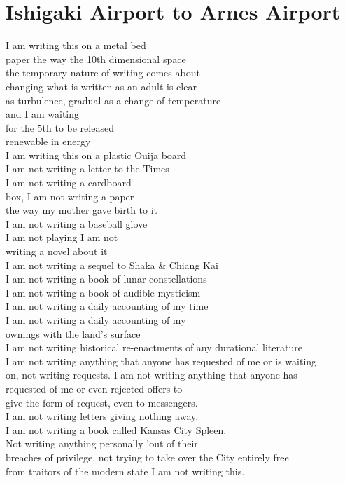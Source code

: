 \documentclass[smalldemyvopaper,11pt,twoside,onecolumn,openright,extrafontsizes]{memoir}
\begin{document}
\chapter{Ishigaki Airport to Arnes Airport}
I am writing this on a metal bed
\\paper the way the 10th dimensional space
\\the temporary nature of writing comes about
\\changing what is written as an adult is clear
\\as turbulence, gradual as a change of temperature
\\and I am waiting
\\for the 5th to be released
\\renewable in energy
\\I am writing this on a plastic Ouija board
\\I am not writing a letter to the Times
\\I am not writing  a cardboard
\\box,  I am not writing  a paper
\\the way my mother gave birth to it
\\I am not writing  a baseball glove
\\I am not playing I am not
\\writing a novel  about it
\\I am not writing a sequel to Shaka \& Chiang Kai
\\I am not writing  a  book of lunar constellations
\\I am not writing  a  book of audible mysticism
\\I am not writing a  daily  accounting  of my time
\\I am not writing  a  daily  accounting  of my
\\ownings with the land's surface
\\I am not writing historical re-enactments of any durational literature
\\I am not writing anything that anyone  has requested of me or is  waiting
\\on,  not  writing  requests.  I am not writing anything that anyone  has
\\requested of me or  even  rejected  offers  to
\\give the form of request,  even to messengers.
\\I am not writing  letters  giving nothing away.
\\I am not writing  a  book  called Kansas City Spleen.
\\Not  writing  anything  personally  'out of their
\\breaches of privilege,  not  trying  to  take over  the  City  entirely  free
\\from  traitors   of  the  modern  state  I  am  not  writing this.
\end{document}
